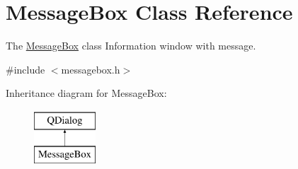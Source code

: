 \hypertarget{classMessageBox}{\section{Message\+Box Class Reference}
\label{classMessageBox}
}


The \hyperlink{classMessageBox}{Message\+Box} class Information window with message.  




{\ttfamily \#include $<$messagebox.\+h$>$}

Inheritance diagram for Message\+Box\+:\begin{figure}[H]
\begin{center}
\leavevmode
\includegraphics[height=2.000000cm]{d2/da3/classMessageBox}
\end{center}
\end{figure}
